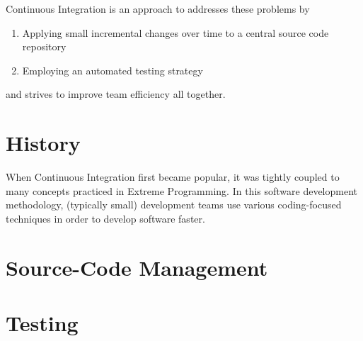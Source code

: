 \documentclass{sig-alternate}
\begin{document}
Continuous Integration is an approach to addresses these problems by
\begin{enumerate}[label=(\alph*)]
    \item Applying small incremental changes over time to a central source code
       repository
    \item Employing an automated testing strategy
\end{enumerate}

and strives to improve team efficiency all together.

\section{History}\label{sec:history}

When Continuous Integration first became popular, it was tightly coupled to many
concepts practiced in Extreme Programming. In this software development
methodology, (typically small) development teams use various coding-focused
techniques in order to develop software faster.

\section{Source-Code Management}
\section{Testing}



\end{document}
